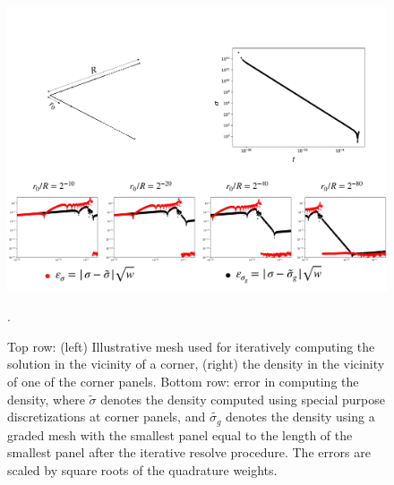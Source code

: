 \begin{figure}
\begin{center}
\includegraphics[width=\linewidth]{paper-figs/density}
\caption{Top row: (left) Illustrative mesh used for iteratively computing the solution in the vicinity of a corner, (right) the density in the vicinity of one of the corner panels. Bottom row: error in computing the density, where $\tilde{\sigma}$ denotes the density computed using special purpose discretizations at corner panels, and $\tilde{\sigma_{g}}$ denotes the density using a graded mesh with the smallest panel equal to the length of the smallest panel after the iterative resolve procedure. The errors are scaled by square roots of the quadrature weights.    }.
\label{fig:dens-error}
\end{center}
\end{figure}

